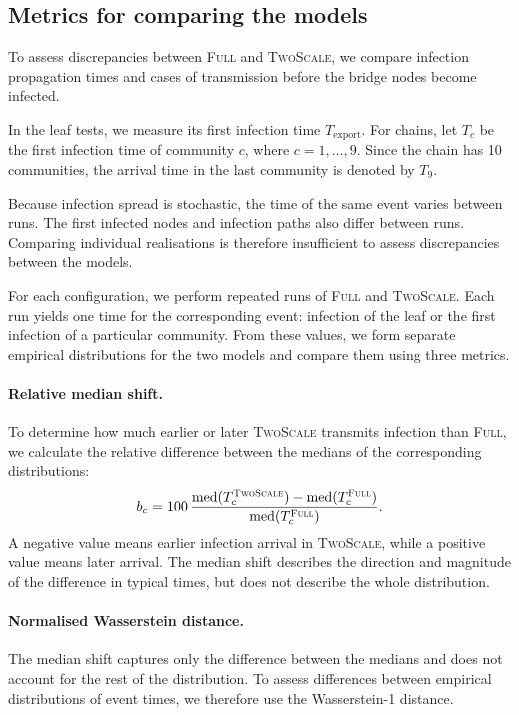 \documentclass[a4paper,fleqn]{cas-sc}
\newcommand{\Full}{\textup{\textsc{Full}}}
\newcommand{\TS}{\textup{\textsc{TwoScale}}}
\begin{document}
\subsection{Metrics for comparing the models}

To assess discrepancies between \Full{} and \TS{}, we compare infection propagation times and cases of transmission before the bridge nodes become infected.

In the leaf tests, we measure its first infection time $T_{\mathrm{export}}$. For chains, let $T_c$ be the first infection time of community $c$, where $c=1,\ldots,9$. Since the chain has 10 communities, the arrival time in the last community is denoted by $T_9$.

Because infection spread is stochastic, the time of the same event varies between runs. The first infected nodes and infection paths also differ between runs. Comparing individual realisations is therefore insufficient to assess discrepancies between the models.

For each configuration, we perform repeated runs of \Full{} and \TS{}. Each run yields one time for the corresponding event: infection of the leaf or the first infection of a particular community. From these values, we form separate empirical distributions for the two models and compare them using three metrics.

\paragraph{Relative median shift.}
To determine how much earlier or later \TS{} transmits infection than \Full{}, we calculate the relative difference between the medians of the corresponding distributions:
\[
b_c =
100\,
\frac{
\operatorname{med}(T_c^{\TS})-
\operatorname{med}(T_c^{\Full})
}{
\operatorname{med}(T_c^{\Full})
}.
\]
A negative value means earlier infection arrival in \TS{}, while a positive value means later arrival. The median shift describes the direction and magnitude of the difference in typical times, but does not describe the whole distribution.

\paragraph{Normalised Wasserstein distance.}
The median shift captures only the difference between the medians and does not account for the rest of the distribution. To assess differences between empirical distributions of event times, we therefore use the Wasserstein-1 distance.
\end{document}
